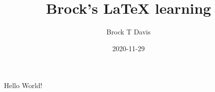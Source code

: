 \documentclass{article}
\title{Brock's LaTeX learning}
\date{2020-11-29}
\author{Brock T Davis}
\begin{document}

  \maketitle


  \newpage

  Hello World!
\end{document}
